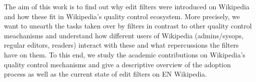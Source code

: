 The aim of this work is to find out why edit filters were introduced on Wikipedia and how these fit in Wikipedia's quality control ecosystem.
More precisely, we want to unearth the tasks taken over by filters in contrast to other quality control meachanisms
and understand how different users of Wikipedia (admins/sysops, regular editors, readers) interact with these and what repercussions the filters have on them.
To this end, we study the academic contributions on Wikipedia's quality control mechanisms and give a descriptive overview of the adoption process as well as the current state of edit filters on EN Wikipedia.


\begin{comment}
Questions from Confluence
  Q1 We wanted to improve our understanding of the role of filters in existing algorithmic quality-control mechanisms (bots, ORES, humans).
  Q2 Which type of tasks do these filters take over in comparison to the other mechanisms? How these tasks evolve over time (are they changes in the type, number, etc.)?
  Q3 Since filters are classical rule-based systems, what are suitable areas of application for such rule-based system in contrast to the other ML-based approaches.

Note:
* to answer the question about evolution over time, I really do need the abuse_filter_history table
* modify 3rd question to: why are regexes still there when we have ML; answering it most probably involves talking to people
* check what questions the first bot papers asked, may serve as inspiration

\begin{itemize}
	\item Was sind die mit dieser Arbeit verfolgten Ziele? Welches Problem soll gelöst werden?
	\item Eine Beschreibung der ersten Ideen, der vorgeschlagene Ansatz und die aktuell erreichten Resultate
	\item Eine Beschreibung, welchen Beitrag die Arbeit leistet, um das vorgestellte Problem zu lösen
	\item Eine Diskussion, wie die vorgeschlagene Lösung sich von bestehenden unterscheidet, was ist neu oder besser?
\end{itemize}

* Think about: what's the computer science take on the field? How can we design a "better"/more efficient/more user friendly system? A system that reflects particular values (vgl Code 2.0, Chapter 3, p.34)?
  * GT is good for tackling controversial questions: e.g. are filters with disallow action a too severe interference with the editing process that has way too much negative consequences? (e.g. driving away new comers?)
\end{comment}

